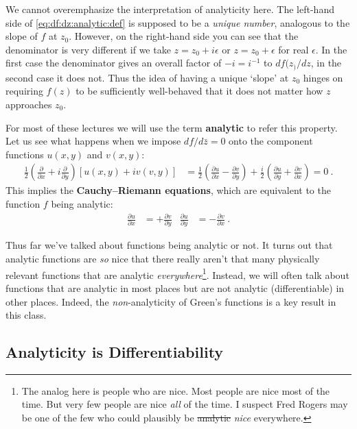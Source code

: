 \begin{example}
We cannot overemphasize the interpretation of analyticity here. The left-hand side of \eqref{eq:df:dz:analytic:def} is supposed to be a \emph{unique number}, analogous to the slope of $f$ at $z_0$. However, on the right-hand side you can see that the denominator is very different if we take $z = z_0+ i \epsilon$ or $z= z_0 + \epsilon$ for real $\epsilon$. In the first case the denominator gives an overall factor of $-i = i^{-1}$ to $df(z_)/dz$, in the second case it does not. Thus the idea of having a unique `slope' at $z_0$ hinges on requiring $f(z)$ to be sufficiently well-behaved that it does not matter how $z$ approaches $z_0$.
\end{example}

For most of these lectures we will use the term \textbf{analytic} to refer this property. Let us see what happens when we impose $df/d\bar{z} = 0$ onto the component functions $u(x,y)$ and $v(x,y)$:
\begin{align}
	\frac{1}{2}\left(\frac{\partial}{\partial x} + i \frac{\partial}{\partial y}\right)
	\left[u(x,y)+iv(v,y)\right]
	&= 
	\frac{1}{2}
	\left( \frac{\partial u}{\partial x} - \frac{\partial v}{\partial y} \right)
	+
	\frac{i}{2}
	\left( \frac{\partial u}{\partial y} + \frac{\partial v}{\partial x} \right)
	= 0 \ .
\end{align}
This implies the \textbf{Cauchy--Riemann equations}, which are equivalent to the function $f$ being analytic:
\begin{align}
	\frac{\partial u}{\partial x} & = +\frac{\partial v}{\partial y}
	&
	\frac{\partial u}{\partial y} & = -\frac{\partial v}{\partial x} \ .
\end{align}

Thus far we've talked about functions being analytic or not. It turns out that analytic functions are \emph{so} nice that there really aren't that many physically relevant functions that are analytic \emph{everywhere}\footnote{The analog here is people who are nice. Most people are nice most of the time. But very few people are nice \emph{all} of the time. I suspect Fred Rogers may be one of the few who could plausibly be \sout{analytic} \emph{nice} everywhere.}. Instead, we will often talk about functions that are analytic in most places but are not analytic (differentiable) in other places. Indeed, the \emph{non}-analyticity of Green's functions is a key result in this class.

\subsection{Analyticity is Differentiability}

